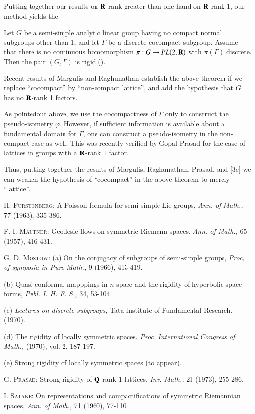 Putting together our results on $\mathbf{R}$-rank greater than one hand on $\mathbf{R}$-rank 1, our method yields the 

\begin{theorem*}
Let $G$ be a semi-simple analytic linear group having no compact normal subgroups other than 1, and let $\Gamma$ be a discrete cocompact subgroup. Assume that there is no continuous homomorphism $\pi : G \to PL (2, \mathbf{R})$ with $\pi (\Gamma)$ discrete. Then the pair $(G,\Gamma)$ is rigid (\cf [3e]).
\end{theorem*}

Recent results of Margulis and Raghunathan establish the above theorem if we replace ``cocompact'' by ``non-compact lattice'', and add the hypothesis that $G$ has no $\mathbf{R}$-rank 1 factors.

As pointed\pageoriginale out above, we use the cocompactness of $\Gamma$ only to construct the pseudo-isometry $\varphi$. However, if sufficient information is available about a fundamental domain for $\Gamma$, one can construct a pseudo-isometry in the non-compact case as well. This was recently verified by Gopal Prasad for the case of lattices in groups with a $\mathbf{R}$-rank 1 factor.

Thus, putting together the results of Margulis, Raghunathan, Prasad, and [3e] we can weaken the hypothesis of ``cocompact'' in the above theorem to merely ``lattice''.


\begin{thebibliography}{99}
 \textsc{H. Furstenberg:} A Poisson formula for semi-simple Lie groups, \textit{Ann. of Math.,} 77 (1963), 335-386.

 \textsc{F. I. Mautner:} Geodesic flows on symmetric Riemann spaces, \textit{Ann. of Math.,} 65 (1957), 416-431.

 \textsc{G. D. Mostow:} (a) On the conjugacy of subgroups of semi-simple groups, \textit{Proc, of symposia in Pure Math.,} 9 (1966), 413-419.

(b) Quasi-conformal mapppings in $n$-space and the rigidity of hyperbolic space forms, \textit{Publ. I. H. E. S.,} 34, 53-104.

(c) \textit{Lectures on discrete subgroups,} Tata Institute of Fundamental Research. (1970).

(d) The rigidity of locally symmetric spaces, \textit{Proc. International Congress of Math.,} (1970), vol. 2, 187-197.

(e) Strong rigidity of locally symmetric spaces (to appear).

 \textsc{G. Prasad:} Strong rigidity of $\mathbf{Q}$-rank 1 lattices, \textit{Inv. Math.,} 21 (1973), 255-286.

 \textsc{I. Satake:} On representations and compactifications of symmetric Riemannian spaces, \textit{Ann. of Math.,} 71 (1960), 77-110.
\end{thebibliography}

